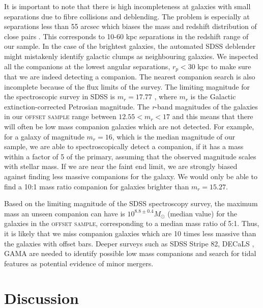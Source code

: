 \documentclass[a4paper,fleqn,usenatbib,useAMS]{mnras}
\begin{document}
It is important to note that there is high incompleteness at galaxies with small separations due to fibre collisions and deblending. The problem is especially at separations less than 55 arcsec which biases the mass and redshift distribution of close pairs \citep{Ellison2008}. This corresponds to 10-60 kpc separations in the redshift range of our sample. In the case of the brightest galaxies, the automated SDSS deblender might mistakenly identify galactic clumps as neighbouring galaxies. We inspected all the companions at the lowest angular separations, $r_{p}<30$ kpc to make sure that we are indeed detecting a companion. The nearest companion search is also incomplete because of the flux limits of the survey. The limiting magnitude for the spectroscopic survey in SDSS is $m_{r}=17.77$ \citep{Strauss2002}, where $m_{r}$ is the Galactic extinction-corrected Petrosian magnitude. The \textit{r}-band magnitudes of the galaxies in our \textsc{offset sample} range between $12.55<m_{r}<17$ and this means that there will often be low mass companion galaxies which are not detected. For example, for a galaxy of magnitude $m_{r}=16$, which is the median magnitude of our sample, we are able to spectroscopically detect a companion, if it has a mass within a factor of 5 of the primary, assuming that the observed magnitude scales with stellar mass. If we are near the faint end limit, we are strongly biased against finding less massive companions for the galaxy. We would only be able to find a 10:1 mass ratio companion for galaxies brighter than $m_{r}=15.27$. 

Based on the limiting magnitude of the SDSS spectroscopy survey, the maximum mass an unseen companion can have is $10^{8.8\pm0.4} M_{\odot}$ (median value) for the galaxies in the \textsc{offset sample}, corresponding to a median mass ratio of 5:1. Thus, it is likely that we miss companion galaxies which are 10 times less massive than the galaxies with offset bars. Deeper surveys such as SDSS Stripe 82, DECaLS \citep{Decals2015}, GAMA \citep{Driver2008} are needed to identify possible low mass companions and search for tidal features as potential evidence of minor mergers.
 

\section{Discussion}
\end{document}
